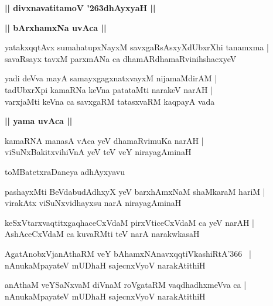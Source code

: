 \documentclass[twoside,12pt,openright]{book}
\def\S{\char'263}
\newcounter{shloka}[chapter]
\def\uvaca#1{\centerline{{\large\textbf{#1}}}}
\begin{document}
\begin{center}         
{\LARGE\bfseries || divxnavatitamoV \S dhAyxyaH ||}
\end{center}

\uvaca{|| bArxhamxNa uvAca ||}

\begin{shloka}%
yatakxqqtAvx sumahatupxNayxM savxgaRsAsxyXdUbxrXhi tanamxma |\\
savaRsayx tavxM parxmANa ca dhamARdhamaRvinihshacxyeV 
\end{shloka}

\begin{shloka}%
yadi deVva mayA samayxgagxnatxvayxM nijamaMdirAM |\\
tadUbxrXpi kamaRNa keVna patataMti narakeV narAH |\\
varxjaMti keVna ca savxgaRM tatasxvaRM kaqpayA vada 
\end{shloka}

\uvaca{|| yama uvAca ||}

\begin{shloka}%
kamaRNA manasA vAca yeV dhamaRvimuKa narAH |\\
viSuNxBakitxvihiVnA yeV teV veY nirayagAminaH 
\end{shloka}

\begin{center}
toMBatetxraDaneya adhAyxyavu
\end{center}

\begin{shloka}%
pashayxMti BeVdabudAdhxyX yeV barxhAmxNaM shaMkaraM hariM |\\
virakAtx viSuNxvidhayxsu narA nirayagAminaH 
\end{shloka}

\begin{shloka}%
keSxVtarxvaqtitxgaqhaceCxVdaM pirxVticeCxVdaM ca yeV narAH |\\
AshAceCxVdaM ca kuvaRMti teV narA narakwkasaH 
\end{shloka}

\begin{shloka}%
AgatAnobxVjanAthaRM veY bAhamxNAnavxqqtiVkashiRtA\char'366 ~|\\
nAnukaMpayateV mUDhaH sajecnxVyoV narakAtithiH 
\end{shloka}

\begin{shloka}%
anAthaM veYSaNxvaM diVnaM roVgataRM vaqdhadhxmeVva ca |\\
nAnukaMpayateV mUDhaH sajecnxVyoV narakAtithiH  
\end{shloka}
\end{document}
